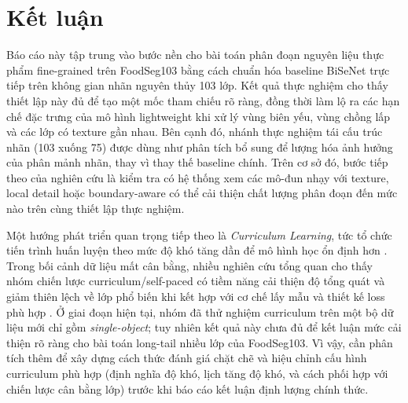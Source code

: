 \section{Kết luận}

Báo cáo này tập trung vào bước nền cho bài toán phân đoạn nguyên liệu thực phẩm fine-grained trên FoodSeg103 bằng cách chuẩn hóa baseline BiSeNet trực tiếp trên không gian nhãn nguyên thủy 103 lớp. Kết quả thực nghiệm cho thấy thiết lập này đủ để tạo một mốc tham chiếu rõ ràng, đồng thời làm lộ ra các hạn chế đặc trưng của mô hình lightweight khi xử lý vùng biên yếu, vùng chồng lấp và các lớp có texture gần nhau. Bên cạnh đó, nhánh thực nghiệm tái cấu trúc nhãn (103 xuống 75) được dùng như phân tích bổ sung để lượng hóa ảnh hưởng của phân mảnh nhãn, thay vì thay thế baseline chính. Trên cơ sở đó, bước tiếp theo của nghiên cứu là kiểm tra có hệ thống xem các mô-đun nhạy với texture, local detail hoặc boundary-aware có thể cải thiện chất lượng phân đoạn đến mức nào trên cùng thiết lập thực nghiệm.

Một hướng phát triển quan trọng tiếp theo là	\textit{Curriculum Learning}, tức tổ chức tiến trình huấn luyện theo mức độ khó tăng dần để mô hình học ổn định hơn 
\cite{bengio2009curriculum,kumar2010selfpaced,soviany2022curriculum}. Trong bối cảnh dữ liệu mất cân bằng, nhiều nghiên cứu tổng quan cho thấy nhóm chiến lược curriculum/self-paced có tiềm năng cải thiện độ tổng quát và giảm thiên lệch về lớp phổ biến khi kết hợp với cơ chế lấy mẫu và thiết kế loss phù hợp \cite{soviany2022curriculum}. Ở giai đoạn hiện tại, nhóm đã thử nghiệm curriculum trên một bộ dữ liệu mới chỉ gồm \textit{single-object}; tuy nhiên kết quả này chưa đủ để kết luận mức cải thiện rõ ràng cho bài toán long-tail nhiều lớp của FoodSeg103. Vì vậy, cần phân tích thêm để xây dựng cách thức đánh giá chặt chẽ và hiệu chỉnh cấu hình curriculum phù hợp (định nghĩa độ khó, lịch tăng độ khó, và cách phối hợp với chiến lược cân bằng lớp) trước khi báo cáo kết luận định lượng chính thức.
